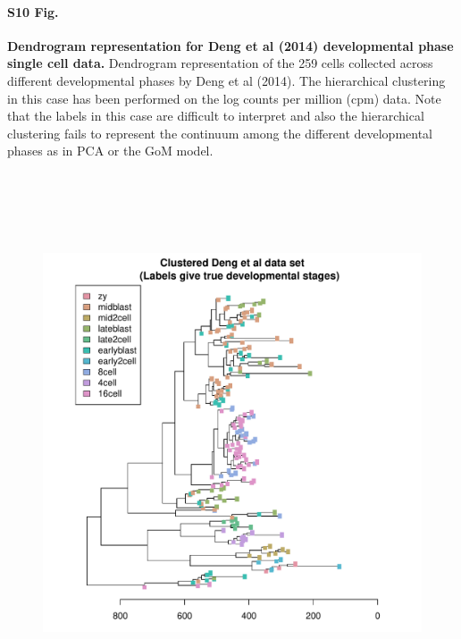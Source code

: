 \documentclass[10pt,letterpaper]{article}
\begin{document}
\paragraph*{S10 Fig.}

\label{figS10}
{\bf Dendrogram representation for Deng et al (2014) developmental phase single cell data.} Dendrogram representation of the 259 cells collected across different
developmental phases by Deng et al (2014). The hierarchical clustering in
this case has been performed on the log counts per million (cpm) data.
Note that the labels in this case are difficult to interpret and also the hierarchical
clustering fails to represent the continuum among the different developmental
phases as in PCA or the GoM model.
\begin{figure}[ht]
\centering
\includegraphics[height=6.3in, width=6in]{../../plots/dendextend_deng.pdf}
\end{figure}
\end{document}
